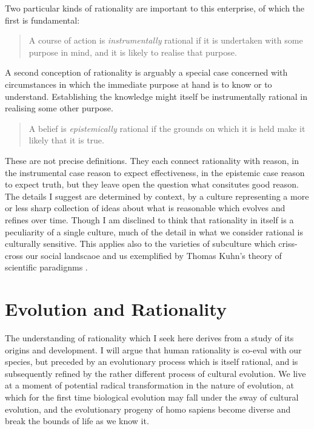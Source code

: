 Two particular kinds of rationality are important to this enterprise, of which the first is fundamental:

\begin{quote}
A course of action is \emph{instrumentally} rational if it is undertaken with some purpose in mind, and it is likely to realise that purpose.
\end{quote}

A second conception of rationality is arguably a special case concerned with circumstances in which the immediate purpose at hand is to know or to understand.
Establishing the knowledge might itself be instrumentally rational in realising some other purpose.

\begin{quote}
A belief is \emph{epistemically} rational if the grounds on which it is held make it likely that it is true. 
\end{quote}

These are not precise definitions.
They each connect rationality with reason,
in the instrumental case reason to expect effectiveness, in the epistemic case reason to expect truth, but they leave open the question what consitutes good reason.
The details I suggest are determined by context, by a culture representing a more or less sharp collection of ideas about what is reasonable which evolves and refines over time.
Though I am disclined to think that rationality in itself is a peculiarity of a single culture,  much of the detail in what we consider rational is culturally sensitive.
This applies also to the varieties of subculture which criss-cross our social landscaoe and us exemplified by Thomas Kuhn's theory of scientific paradignms \cite{kuhn2012structure}.

\section{Evolution and Rationality}

The understanding of rationality which I seek here derives from a study of its origins and development.
I will argue that human rationality is co-eval with our species, but preceded by an evolutionary process which is itself rational, and is subsequently refined by the rather different process of cultural evolution.
We live at a moment of potential radical transformation in the nature of evolution, at which for the first time biological evolution may fall under the sway of cultural evolution, and the evolutionary progeny of homo sapiens become diverse and break the bounds of life as we know it.

